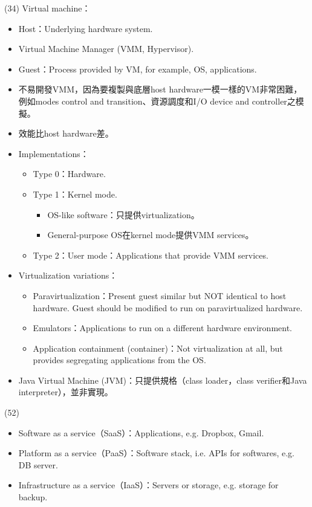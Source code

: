 \begin{theorem}{(34)} Virtual machine：\begin{itemize}
        \item Host：Underlying hardware system.
        \item Virtual Machine Manager (VMM, Hypervisor).
        \item Guest：Process provided by VM, for example, OS, applications.
        \item 不易開發VMM，因為要複製與底層host hardware一模一樣的VM非常困難，例如modes control and transition、資源調度和I/O device and controller之模擬。
        \item 效能比host hardware差。
        \item Implementations：\begin{itemize}
            \item Type 0：Hardware.
            \item Type 1：Kernel mode. \begin{itemize}
                \item OS-like software：只提供virtualization。
                \item General-purpose OS在kernel mode提供VMM services。
            \end{itemize}
            \item Type 2：User mode：Applications that provide VMM services.
        \end{itemize}
        \item Virtualization variations：\begin{itemize}
            \item Paravirtualization：Present guest similar but NOT identical to host hardware. Guest should be modified to run on paravirtualized hardware.
            \item Emulators：Applications to run on a different hardware environment.
            \item Application containment (container)：Not virtualization at all, but provides segregating applications from the OS.
        \end{itemize}
        \item Java Virtual Machine (JVM)：只提供規格（class loader，class verifier和Java interpreter），並非實現。
    \end{itemize}
\end{theorem}

\begin{theorem}{(52)} \quad\quad \begin{itemize}
        \item Software as a service（SaaS）：Applications, e.g. Dropbox, Gmail.
        \item Platform as a service（PaaS）：Software stack, i.e. APIs for softwares, e.g. DB server.
        \item Infrastructure as a service（IaaS）：Servers or storage, e.g. storage for backup.
    \end{itemize}
\end{theorem}
